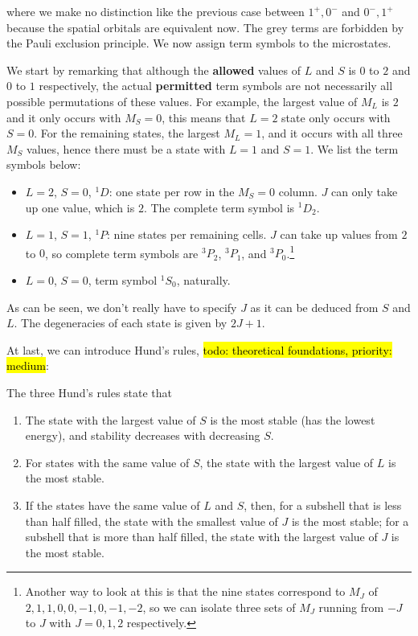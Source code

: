where we make no distinction like the previous case between $1^+,0^-$ and 
$0^-,1^+$ because the spatial orbitals are equivalent now. The grey terms are 
forbidden by the Pauli exclusion principle. We now assign term symbols to the 
microstates. \par
We start by remarking that although the \textbf{allowed} values of 
$L$ and $S$ is $0$ to $2$ and $0$ to $1$ respectively, the actual \textbf{permitted} term symbols are not necessarily all possible permutations of these values. For example, the largest value of $M_L$ is $2$ and it only occurs with $M_S=0$, this means that $L=2$ state only occurs with $S=0$. For the remaining states, the largest $M_L=1$, and it occurs with all three $M_S$ values, hence there must be a state with $L=1$ and $S=1$. We list the term symbols below:
\begin{itemize}
	\item $L=2$, $S=0$, \ie $^1D$: one state per row in the $M_S=0$ column. $J$ can only take up one value, which is $2$. The complete term symbol is $^1D_2$.
	\item $L=1$, $S=1$, \ie $^1P$: nine states per remaining cells. $J$ can take up values from $2$ to $0$, so complete term symbols are $^3P_2$, $^3P_1$, and $^3P_0$.\footnote{Another way to look at this is that the nine states correspond to $M_J$ of $2,1,1,0,0,-1,0,-1,-2$, so we can isolate three sets of $M_J$ running from $-J$ to $J$ with $J=0,1,2$ respectively.}
	\item $L=0$, $S=0$, term symbol $^1S_0$, naturally.
\end{itemize}
As can be seen, we don't really have to specify $J$ as it can be deduced from $S$ and $L$. The degeneracies of each state is given by $2J+1$. \par
At last, we can introduce Hund's rules, \hl{todo: theoretical foundations, priority: medium}:
\begin{thrm}
The three Hund's rules state that
\begin{enumerate}
	\item The state with the largest value of $S$ is the most stable (has the lowest energy), and stability decreases with decreasing $S$. 
	\item For states with the same value of $S$, the state with the largest value of $L$ is the most stable. 
	\item If the states have the same value of $L$ and $S$, then, for a subshell that is less than half filled, the state with the smallest value of $J$ is the most stable; for a subshell that is more than half filled, the state with the largest value of $J$ is the most stable. 
\end{enumerate}
\end{thrm}
